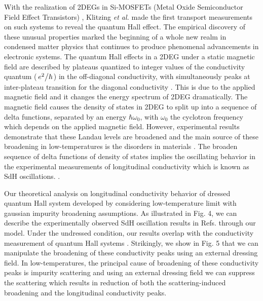 \documentclass{article}
\begin{document}
\begin{itemize}
{  With the realization of 2DEGs in Si-MOSFETs (Metal Oxide Semiconductor Field Effect Transistors) \citep{fowler66}, Klitzing \textit{et al.} \cite{klitzing80} made the first transport measurements on such systems to reveal the quantum Hall effect. The empirical discovery of these unusual properties marked the beginning of a whole new realm in condensed matter physics that continues to produce phenomenal advancements in electronic systems. The quantum Hall effects in a 2DEG under a static magnetic field are described by plateaus quantized to integer values of the conductivity quantum ($\flatfrac{e^2}{\hbar}$) in the off-diagonal conductivity, with simultaneously peaks at inter-plateau transition for the diagonal conductivity \cite{endo09}. This is due to the applied magnetic field and it changes the energy spectrum of 2DEG dramatically. The magnetic field causes the density of states in 2DEG to split up into a sequence of delta functions, separated by an energy $\hbar\omega_0$, with $\omega_0$ the cyclotron frequency which depends on the applied magnetic field.
  However, experimental results demonstrate that these Landau levels are broadened and the main source of these broadening in low-temperatures is the disorders in materials \cite{ando85,dial07}. The broaden sequence of delta functions of density of states implies the oscillating behavior in the experimental measurements of longitudinal conductivity which is known as SdH oscillations. \cite{endo09,wakabayashi78}.

  Our theoretical analysis on longitudinal conductivity behavior of dressed quantum Hall system developed by considering low-temperature limit with gaussian impurity broadening assumptions.
  As illustrated in Fig. 4, we can describe the experimentally observed SdH oscillation results in Refs.\cite{endo09,wakabayashi78} through our model.
  Under the undressed condition, our results overlap with the conductivity measurement of quantum Hall systems \cite{endo09}. Strikingly, we show in Fig. 5 that we can manipulate the broadening of these conductivity peaks using an external dressing field. In low-temperatures, the principal cause of broadening of these conductivity peaks is impurity scattering and using an external dressing field we can suppress the scattering which results in reduction of both the scattering-induced broadening and the longitudinal conductivity peaks.

}
\end{itemize}
\end{document}
